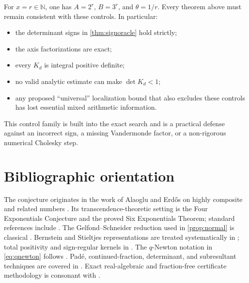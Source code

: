\documentclass[11pt]{article}
\theoremstyle{definition}
\theoremstyle{remark}
\newcommand{\N}{\mathbb N}
\begin{document}
For $x=r\in\N$, one has $A=2^r$, $B=3^r$, and $\theta=1/r$.  Every theorem above must remain
consistent with these controls.  In particular:
\begin{itemize}
\item the determinant signs in \cref{thm:signoracle} hold strictly;
\item the axis factorizations are exact;
\item every $K_d$ is integral positive definite;
\item no valid analytic estimate can make $\det K_d<1$;
\item any proposed ``universal'' localization bound that also excludes these controls has
      lost essential mixed arithmetic information.
\end{itemize}
This control family is built into the exact search and is a practical defense against an
incorrect sign, a missing Vandermonde factor, or a non-rigorous numerical Cholesky step.

\section{Bibliographic orientation}

The conjecture originates in the work of Alaoglu and Erd\H{o}s on highly composite and
related numbers \cite{alaogluerdos}.  Its transcendence-theoretic setting is the Four
Exponentials Conjecture and the proved Six Exponentials Theorem; standard references include
\cite{lang,waldschmidt,baker}.  The Gelfond--Schneider reduction used in
\cref{prop:normal} is classical \cite{gelfond,baker}.  Bernstein and Stieltjes representations
are treated systematically in \cite{schilling,akhiezer}; total positivity and sign-regular
kernels in \cite{karlin}.  The $q$-Newton notation in \eqref{eq:qnewton} follows
\cite{gasperrahman}.  Pad\'e, continued-fraction, determinant, and subresultant techniques are
covered in \cite{wall,bakergraves,krattenthaler}.  Exact real-algebraic and fraction-free
certificate methodology is consonant with \cite{basupollackroy}.
\end{document}
